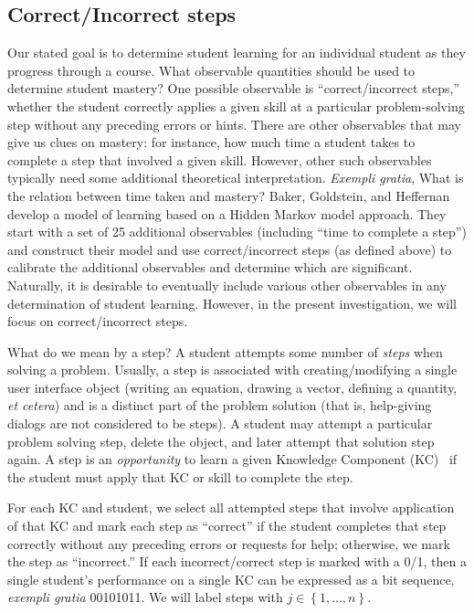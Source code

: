\documentclass{edm_template}
\begin{document}
\subsection{Correct/Incorrect steps}

Our stated goal is to determine student learning for an individual
student as they progress through a course.  What observable quantities
should be used to determine student mastery?  One possible observable
is ``correct/incorrect steps,'' whether the student correctly applies
a given skill at a particular problem-solving step without any
preceding errors or hints.  There are other observables that may give
us clues on mastery: for instance, how much time a student takes to
complete a step that involved a given skill.  However, other such
observables typically need some additional theoretical
interpretation. {\em Exempli gratia}, What is the relation between
time taken and mastery?  Baker, Goldstein, and
Heffernan~\citeyear{baker_detecting_2011} develop a model of learning
based on a Hidden Markov model approach.  They start with a set of
25 additional observables (including ``time to complete a step'') and
construct their model and use correct/incorrect steps (as defined
above) to calibrate the additional observables and determine which are
significant.   Naturally, it is
desirable to eventually include various other observables in any determination
of student learning.   However, in the present investigation,
we will focus on correct/incorrect steps.

What do we mean by a step?
A student attempts some number of {\em steps}  when solving a problem.  
Usually, a step is associated with creating/modifying a single user
interface object (writing an equation, drawing a vector,
defining a quantity, {\em et cetera}) and is a distinct part of the problem solution
(that is, help-giving dialogs are not considered to be steps).
A student may attempt a particular problem solving
step, delete the object, and later attempt that solution step again.
A step is an {\em opportunity} to learn
a given  Knowledge Component (KC)~\cite{vanlehn_behavior_2006} if the student 
must apply that KC or skill to complete the step.

%
%

For each KC and student, we select all attempted steps that involve application
of that KC and mark each step as ``correct'' if
the student completes that step correctly without any preceding errors or 
requests for help; otherwise, we mark the step as ``incorrect.''
\label{steps}  %
If each incorrect/correct step is marked with a 0/1, then
a single student's performance on a single KC can be expressed as a bit  sequence,
{\em exempli gratia} 00101011.  We will label
steps with $j\in\left\{1,\ldots,n\right\}$.  
\end{document}
